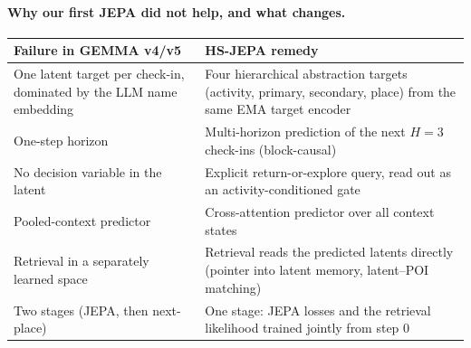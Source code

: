 \documentclass[10.5pt]{article}
\begin{document}
\paragraph{Why our first JEPA did not help, and what changes.}
\begin{center}\small
\begin{tabularx}{\linewidth}{>{\raggedright\arraybackslash}p{4.7cm}X}
\toprule
Failure in GEMMA v4/v5 & HS-JEPA remedy \\
\midrule
One latent target per check-in, dominated by the LLM name embedding & Four hierarchical abstraction targets (activity, primary, secondary, place) from the same EMA target encoder \\
One-step horizon & Multi-horizon prediction of the next $H{=}3$ check-ins (block-causal) \\
No decision variable in the latent & Explicit return-or-explore query, read out as an activity-conditioned gate \\
Pooled-context predictor & Cross-attention predictor over all context states \\
Retrieval in a separately learned space & Retrieval reads the predicted latents directly (pointer into latent memory, latent--POI matching) \\
Two stages (JEPA, then next-place) & One stage: JEPA losses and the retrieval likelihood trained jointly from step 0 \\
\bottomrule
\end{tabularx}
\end{center}
\end{document}
